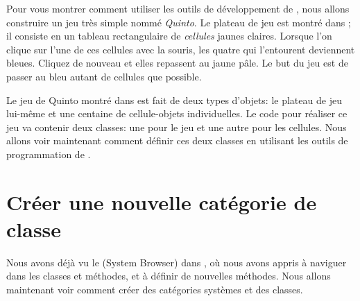 \documentclass[a4paper,10pt,twoside]{book}
\begin{document}
Pour vous montrer comment utiliser les outils de développement de
\pharo, nous allons construire un jeu très simple nommé
\emph{Quinto}.  Le plateau de jeu est montré dans
; il consiste en un tableau rectangulaire de
\emph{cellules} jaunes claires.  Lorsque l'on clique sur l'une de ces
cellules avec la souris, les quatre qui l'entourent deviennent
bleues. Cliquez de nouveau et elles repassent au jaune p\^ale. Le but du 
jeu est de passer au bleu autant de cellules que possible.

Le jeu de Quinto montré dans  est fait de deux types d'objets: le plateau de jeu lui-m\^eme et une centaine de cellule-objets individuelles. Le code \pharo pour réaliser ce jeu va contenir deux classes: une pour le jeu et une autre pour les cellules.
Nous allons voir maintenant comment définir ces deux classes en utilisant les outils de programmation de \pharo.

\section{Créer une nouvelle catégorie de classe}

Nous avons déjà vu le  (System Browser)
dans , o\`u nous avons appris à naviguer dans les classes
et méthodes, et à définir de nouvelles méthodes.
Nous allons maintenant voir comment créer des catégories systèmes et des classes.

\end{document}
